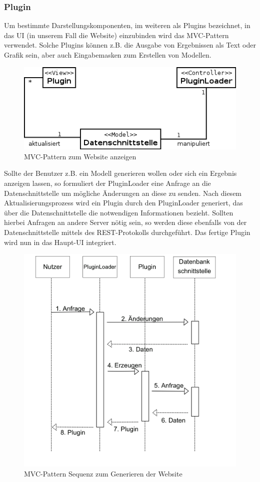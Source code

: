 
\subsubsection{Plugin}
Um bestimmte Darstellungskomponenten, im weiteren als Plugins bezeichnet, in das UI (in unserem Fall die Website) einzubinden wird das MVC-Pattern verwendet. Solche Plugins können z.B. die Ausgabe von Ergebnissen als Text oder Grafik sein, aber auch Eingabemasken zum Erstellen von Modellen.

\begin{figure}[h]
\centering
\includegraphics[width=0.6\linewidth]{Grafik/Diagramm/Pattern/MVC/Kontextdiagramm.png}
\caption[MVC Website Klassen]{MVC-Pattern zum Website anzeigen}
\end{figure}

\noindent Sollte der Benutzer z.B. ein Modell generieren wollen oder sich ein Ergebnis anzeigen lassen, so formuliert der PluginLoader eine Anfrage an die Datenschnittstelle um mögliche Änderungen an diese zu senden. Nach diesem Aktualisierungsprozess wird ein Plugin durch den PluginLoader generiert, das über die Datenschnittstelle die notwendigen Informationen bezieht. Sollten hierbei Anfragen an andere Server nötig sein, so werden diese ebenfalls von der Datenschnittstelle mittels des REST-Protokolls durchgeführt. 
Das fertige Plugin wird nun in das Haupt-UI integriert.

\begin{figure}[h]
\centering
\includegraphics[width=0.6\linewidth]{Grafik/Diagramm/Pattern/MVC/Sequenzdiagramm.png}
\caption[MVC Website Sequenz]{MVC-Pattern Sequenz zum Generieren der Website}
\end{figure}

